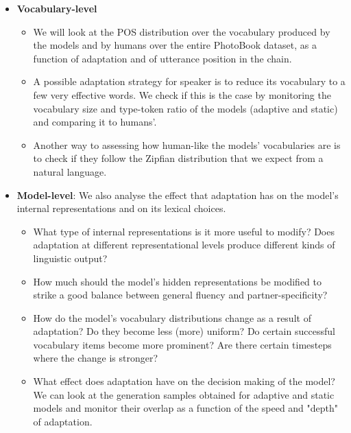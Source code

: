 \begin{itemize}
\begin{itemize}
	\end{itemize}
\item \textbf{Vocabulary-level}
	\begin{itemize}
	\item We will look at the POS distribution over the vocabulary produced by the models and by humans over the entire PhotoBook dataset, as a function of adaptation and of utterance position in the chain.
	\item A possible adaptation strategy for speaker is to reduce its vocabulary to a few very effective words. We check if this is the case by monitoring the vocabulary size and type-token ratio of the models (adaptive and static) and comparing it to humans'.
	\item Another way to assessing how human-like the models' vocabularies are is to check if they follow the Zipfian distribution that we expect from a natural language. 
	\end{itemize}
\item \textbf{Model-level}: We also analyse the effect that adaptation has on the model's internal representations and on its lexical choices.
	\begin{itemize}
	\item What type of internal representations is it more useful to modify? Does adaptation at different representational levels produce different kinds of linguistic output?
	\item How much should the model's hidden representations be modified to strike a good balance between general fluency and partner-specificity? 
	\item How do the model's vocabulary distributions change as a result of adaptation? Do they become less (more) uniform? Do certain successful vocabulary items become more prominent? Are there certain timesteps where the change is stronger?
	\item What effect does adaptation have on the decision making of the model? We can look at the generation samples obtained for adaptive and static models and monitor their overlap as a function of the speed and "depth" of adaptation.
	\end{itemize}
\end{itemize}

